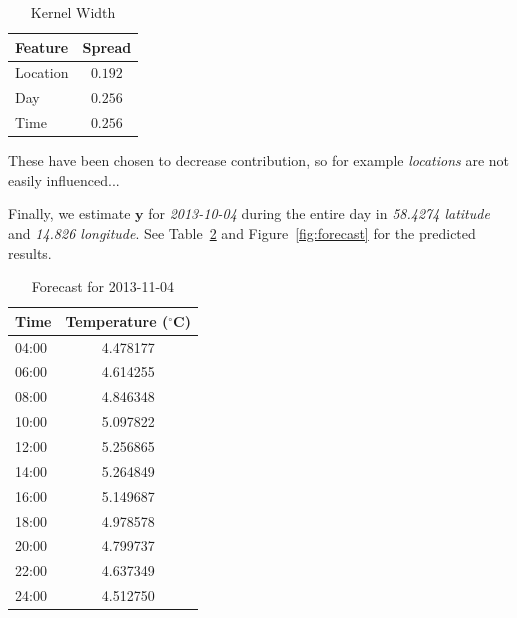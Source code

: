 \documentclass[a4paper, twocolumn]{article}
\begin{document}
    \begin{table}[h!]
        \begin{center}
            \begin{tabular}{lc}
                \toprule
                \textbf{Feature} & \textbf{Spread}\\
                \midrule
                Location & \(0.192\) \\
                Day &      \(0.256\) \\
                Time &     \(0.256\) \\
                \bottomrule
            \end{tabular}
        \end{center}
        \caption{Kernel Width}
        \label{tab:spread}
    \end{table}

    These have been chosen to decrease contribution, so for example \emph{locations} are not easily influenced...

    \clearpage

    Finally, we estimate $\bm{y}$ for \emph{2013-10-04} during the entire day in \emph{58.4274 latitude} and \emph{14.826 longitude}. See Table~\ref{tab:forecast} and Figure~\ref{fig:forecast} for the predicted results.

    \begin{table}[h!]
        \begin{center}
            \begin{tabular}{lc}
                \toprule
                \textbf{Time} & \textbf{Temperature ($^\circ$C)} \\
                \midrule
                04:00 & 4.478177 \\
                06:00 & 4.614255 \\
                08:00 & 4.846348 \\
                10:00 & 5.097822 \\
                12:00 & 5.256865 \\
                14:00 & 5.264849 \\
                16:00 & 5.149687 \\
                18:00 & 4.978578 \\
                20:00 & 4.799737 \\
                22:00 & 4.637349 \\
                24:00 & 4.512750 \\
                \bottomrule
            \end{tabular}
        \end{center}
        \caption{Forecast for 2013-11-04}
        \label{tab:forecast}
    \end{table}
\end{document}
